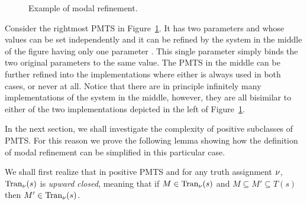 \begin{figure}[b!]
\caption{Example of modal refinement.}\label{fig:mr-ex}
\end{figure}



\begin{example}
Consider the rightmost PMTS in Figure~\ref{fig:mr-ex}.
It has two parameters
\mustGoYellow and \mustGoYellowRed whose values can be set independently
and it can be refined by the system in the middle of the figure having
only one parameter \mustGoYellowBoth. This single parameter simply binds 
the two original parameters to the same value. The PMTS in the middle
can be further refined into the implementations where either 
\yellow is always used in both cases, or never at all.
Notice that there are in principle infinitely many implementations
of the system in the middle, however, they are all %
bisimilar to
either of the two implementations depicted in the left of Figure~\ref{fig:mr-ex}.
\end{example}

In the next section, we shall investigate the complexity of positive subclasses of PMTS.
For this reason we prove the following lemma showing how the definition of
modal refinement can be simplified in this particular case.

We shall first realize that in positive PMTS and for any truth assignment $\nu$, 
$\mathrm{Tran}_{\nu}(s)$ is \emph{upward closed},
meaning that if $M \in \mathrm{Tran}_{\nu}(s)$ and
$M \subseteq  M' \subseteq T(s)$ then $M' \in \mathrm{Tran}_{\nu}(s)$. 


